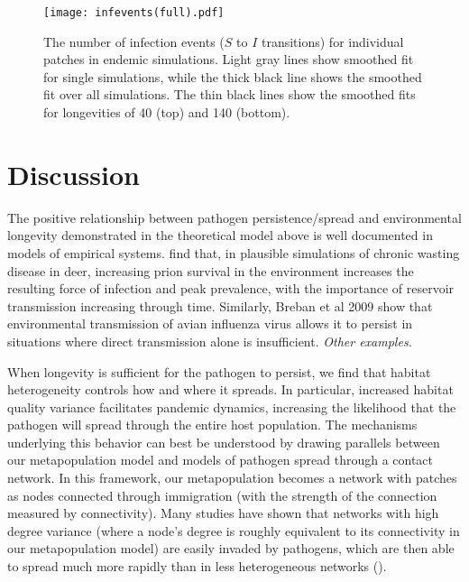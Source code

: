 \documentclass{svjour3}
\begin{document}
\begin{figure}
\centering
\texttt{[image: infevents(full).pdf]}
\caption{The number of infection events ($S$ to $I$ transitions) for individual patches in endemic simulations.  Light gray lines show smoothed fit for single simulations, while the thick black line shows the smoothed fit over all simulations.  The thin black lines show the smoothed fits for longevities of 40 (top) and 140 (bottom).}
\label{infections}
\end{figure}

\section{Discussion}
\label{discussion} 

The positive relationship between pathogen persistence/spread and environmental longevity demonstrated in the theoretical model above is well documented in models of empirical systems.  \cite{Almberg2011} find that, in plausible simulations of chronic wasting disease in deer, increasing prion survival in the environment increases the resulting force of infection and peak prevalence, with the  importance of reservoir transmission increasing through time.  Similarly, Breban et al 2009 show that environmental transmission of avian influenza virus allows it to persist in situations where direct transmission alone is insufficient.  \emph{Other examples.}

When longevity is sufficient for the pathogen to persist, we find that habitat heterogeneity controls how and where it spreads.  In particular, increased habitat quality variance facilitates pandemic dynamics, increasing the likelihood that the pathogen will spread through the entire host population.  The mechanisms underlying this behavior can best be understood by drawing parallels between our metapopulation model and models of pathogen spread through a contact network.  In this framework, our metapopulation becomes a network with patches as nodes connected through immigration (with the strength of the connection measured by connectivity).  Many studies have shown that networks with high degree variance (where a node's degree is roughly equivalent to its connectivity in our metapopulation model) are easily invaded by pathogens, which are then able to spread much more rapidly than in less heterogeneous networks (\cite{Pastor-Satorras2001}).
\end{document}
